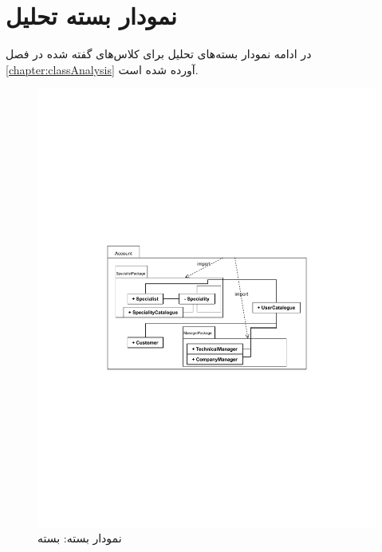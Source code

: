 \chapter{نمودار بسته تحلیل}

در ادامه نمودار بسته‌های تحلیل برای کلاس‌های گفته شده در فصل
\ref{chapter:classAnalysis}
آورده شده است.


\begin{figure}[ht!]
	\centering
	\includegraphics[scale=0.8]{figs/OOD-package-1.pdf}
	\caption{نمودار بسته: بسته }
\end{figure}
\FloatBarrier
\newpage

